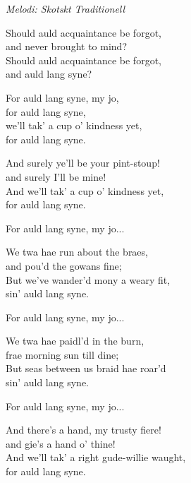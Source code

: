 {\footnotesize\textit{Melodi: Skotskt Traditionell}}\par
\vspace{10pt}
Should auld acquaintance be forgot,\\
and never brought to mind?\\
Should auld acquaintance be forgot,\\
and auld lang syne?\par
\vspace{10pt}
For auld lang syne, my jo,\\
for auld lang syne,\\
we'll tak' a cup o' kindness yet,\\
for auld lang syne.\par
\vspace{10pt}
And surely ye'll be your pint-stoup!\\
and surely I'll be mine!\\
And we'll tak' a cup o' kindness yet,\\
for auld lang syne.\par
\vspace{10pt}
For auld lang syne, my jo...\par
\vspace{10pt}
We twa hae run about the braes,\\
and pou'd the gowans fine;\\
But we've wander'd mony a weary fit,\\
sin' auld lang syne.\par
\vspace{10pt}
For auld lang syne, my jo...\par
\vspace{10pt}
We twa hae paidl'd in the burn,\\
frae morning sun till dine;\\
But seas between us braid hae roar'd\\
sin' auld lang syne.\par
\vspace{10pt}
For auld lang syne, my jo...\par
\vspace{10pt}
And there's a hand, my trusty fiere!\\
and gie's a hand o' thine!\\
And we'll tak' a right gude-willie waught,\\
for auld lang syne.\par
\vspace{10pt}
